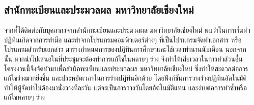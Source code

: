 \subsection{สำนักทะเบียนและประมวลผล มหาวิทยาลัยเชียงใหม่}
จากที่ได้ติดต่อกับบุคลากรจากสำนักทะเบียนและประมวลผล มหาวิทยาลัยเชียงใหม่ พบว่าในการเริ่มทำปฏิทินเกิดจากการทำมือ และทำจากโปรแกรมคอมพิวเตอร์ต่างๆ ที่เป็นโปรแกรมจัดทำเอกสาร
%
หรือโปรแกรมสำหรับเอกสาร มาร่างกำหนดการของปฏิทินการศึกษาและใช้เวลาทำนานนับเดือน นอกจากนั้น หากนำไปเสนอในที่ประชุมจะต้องทำการแก้ไขในหลายๆ ร่าง จึงทำให้เสียเวลาในการทำส่วนอื่น
%
โครงงานนี้จึงจัดทำมาเพื่อสำนักทะเบียนและประมวลผล มหาวิทยาลัยเชียงใหม่ ซึ่งทำให้สะดวกต่อการแก้ไขร่างมากยิ่งขึ้น และประหยัดเวลาในการร่างปฏิทินอีกด้วย โดยฟังก์ชันการวางร่างปฏิทินอัตโนมัติ ทำให้ผู้จัดทำไม่ต้องมานั่งวางทีละวัน แต่จะเป็นการวางวันโดยอัตโนมัติแทน และง่ายต่อการทำซ้ำหรือแก้ไขหลายๆ ร่าง
